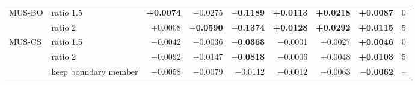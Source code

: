\begin{table}[!htbp]
\begin{adjustbox}{max width=\linewidth}
\begin{tabular}{llrrrrrrr}
\midrule
MUS-BO & ratio 1.5 & \textbf{+0.0074} & $-$0.0275 & \textbf{$-$0.1189} & \textbf{+0.0113} & \textbf{+0.0218} & \textbf{+0.0087} & 0 \\
 & ratio 2 & +0.0008 & \textbf{$-$0.0590} & \textbf{$-$0.1374} & \textbf{+0.0128} & \textbf{+0.0292} & \textbf{+0.0115} & 5 \\
\midrule
MUS-CS & ratio 1.5 & $-$0.0042 & $-$0.0036 & \textbf{$-$0.0363} & $-$0.0001 & +0.0027 & \textbf{+0.0046} & 0 \\
 & ratio 2 & $-$0.0092 & $-$0.0147 & \textbf{$-$0.0818} & $-$0.0006 & +0.0048 & \textbf{+0.0103} & 5 \\
 & keep boundary member & $-$0.0058 & $-$0.0079 & $-$0.0112 & $-$0.0012 & $-$0.0063 & \textbf{$-$0.0062} & -- \\
\bottomrule
\end{tabular}
\end{adjustbox}
\end{table}
